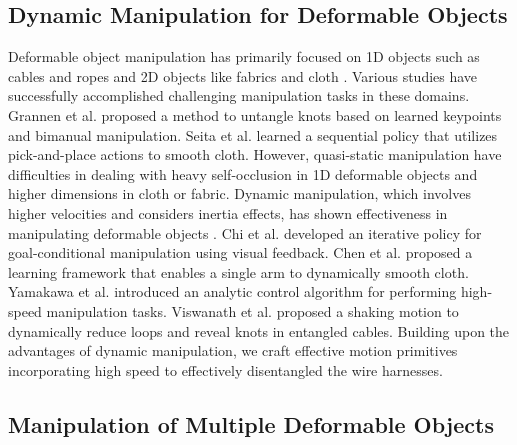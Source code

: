 \documentclass[letterpaper, 10 pt, conference]{ieeeconf}
\begin{document}
\subsection{Dynamic Manipulation for Deformable Objects}
    Deformable object manipulation has primarily focused on 1D objects such as cables and ropes \cite{lui2013tangled,grannen2020untangling,lim2022real2sim2real,she2021cable,ma2023robotic,chi2022irp} and 2D objects like fabrics and cloth \cite{yamakawa2008knotting,yamakawa2011dynamic,ha2022flingbot,hoque2020visuospatial}. Various studies have successfully accomplished challenging manipulation tasks in these domains. Grannen et al. \cite{grannen2020untangling} proposed a method to untangle knots based on learned keypoints and bimanual manipulation. Seita et al. \cite{seita2020deep} learned a sequential policy that utilizes pick-and-place actions to smooth cloth. However, quasi-static manipulation have difficulties in dealing with heavy self-occlusion in 1D deformable objects and higher dimensions in cloth or fabric. Dynamic manipulation, which involves higher velocities and considers inertia effects, has shown effectiveness in manipulating deformable objects \cite{yamakawa2008knotting,chi2022irp,ha2022flingbot,yamakawa2011dynamic,hoque2020visuospatial}. Chi et al. \cite{chi2022irp} developed an iterative policy for goal-conditional manipulation using visual feedback. Chen et al. \cite{chen2022efficiently} proposed a learning framework that enables a single arm to dynamically smooth cloth. Yamakawa et al. \cite{yamakawa2008knotting,yamakawa2011dynamic} introduced an analytic control algorithm for performing high-speed manipulation tasks. Viswanath et al. \cite{viswanath2022autonomously} proposed a shaking motion to dynamically reduce loops and reveal knots in entangled cables. Building upon the advantages of dynamic manipulation, we craft effective motion primitives incorporating high speed to effectively disentangled the wire harnesses. 
    
\subsection{Manipulation of Multiple Deformable Objects}
\end{document}
